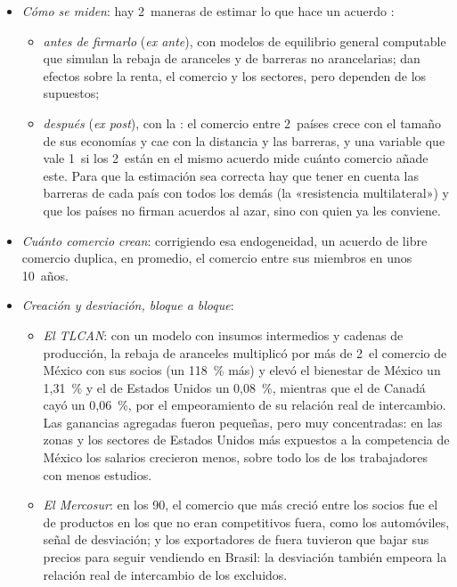 \documentclass[11pt]{article}
\begin{document}
\begin{itemize}
\item \emph{Cómo se miden}: hay 2~maneras de estimar lo que hace un acuerdo :
  \begin{itemize}
  \item \emph{antes de firmarlo} (\emph{ex ante}), con modelos de equilibrio general computable que simulan la rebaja de aranceles y de barreras no arancelarias; dan efectos sobre la renta, el comercio y los sectores, pero dependen de los supuestos;
  \item \emph{después} (\emph{ex post}), con la : el comercio entre 2~países crece con el tamaño de sus economías y cae con la distancia y las barreras, y una variable que vale 1~si los 2~están en el mismo acuerdo mide cuánto comercio añade este. Para que la estimación sea correcta hay que tener en cuenta las barreras de cada país con todos los demás (la «resistencia multilateral»)\nocite{AndersonVanWincoop2003} y que los países no firman acuerdos al azar, sino con quien ya les conviene.
  \end{itemize}
\item \emph{Cuánto comercio crean}: corrigiendo esa endogeneidad, un acuerdo de libre comercio duplica, en promedio, el comercio entre sus miembros en unos 10~años\nocite{BaierBergstrand2007}.
\item \emph{Creación y desviación, bloque a bloque}:
  \begin{itemize}
  \item \emph{El TLCAN}: con un modelo con insumos intermedios y cadenas de producción, la rebaja de aranceles multiplicó por más de 2~el comercio de México con sus socios (un 118~\% más) y elevó el bienestar de México un 1,31~\% y el de Estados Unidos un 0,08~\%, mientras que el de Canadá cayó un 0,06~\%, por el empeoramiento de su relación real de intercambio\nocite{CaliendoParro2015}. Las ganancias agregadas fueron pequeñas, pero muy concentradas: en las zonas y los sectores de Estados Unidos más expuestos a la competencia de México los salarios crecieron menos, sobre todo los de los trabajadores con menos estudios\nocite{HakobyanMcLaren2016}.
  \item \emph{El Mercosur}: en los 90, el comercio que más creció entre los socios fue el de productos en los que no eran competitivos fuera, como los automóviles, señal de desviación\nocite{Yeats1998}; y los exportadores de fuera tuvieron que bajar sus precios para seguir vendiendo en Brasil: la desviación también empeora la relación real de intercambio de los excluidos\nocite{ChangWinters2002}.

\end{itemize}
\end{itemize}
\end{document}
